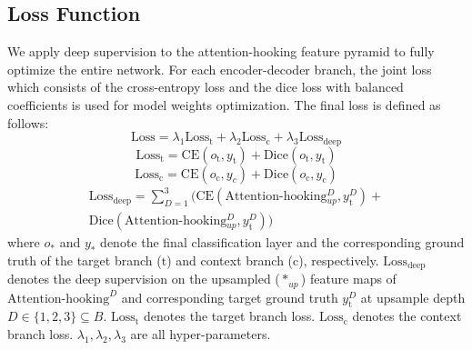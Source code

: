 \documentclass[lettersize,journal,siunitx]{IEEEtran}
\begin{document}
\subsection{Loss Function}
We apply deep supervision to the attention-hooking feature pyramid to fully optimize the entire network. For each encoder-decoder branch, the joint loss which consists of the cross-entropy loss and the dice loss with balanced coefficients is used for model weights optimization. The final loss is defined as follows:
\begin{equation}
\mathrm{Loss}=\lambda{_1}\mathrm{Loss_{t}}+\lambda{_2}\mathrm{Loss_{c}}+\lambda{_3}\mathrm{Loss_{deep}}
\label{eq7}
\end{equation}
\begin{equation}
    \mathrm{Loss_{t}}=\mathrm{CE}(o_\mathrm{t},y_\mathrm{t})+\mathrm{Dice}(o_\mathrm{t},y_\mathrm{t})
\end{equation}
\begin{equation}
    \mathrm{Loss_{c}}=\mathrm{CE}(o_\mathrm{c},y_{c})+\mathrm{Dice}(o_\mathrm{c},y_\mathrm{c})
\end{equation}
\begin{multline}
    \mathrm{Loss_{deep}}=\sum_{D=1}^{3}\bigl(\mathrm{CE}(\mathrm{Attention\mbox{-}hooking}{^{D}_{up}},y_\mathrm{t}^{D})+ \\ \mathrm{Dice}(\mathrm{Attention\mbox{-}hooking}{^{D}_{up}},y_\mathrm{t}^{D})\bigr)
\end{multline}
where $o_{*}$ and $y_{*}$ denote the final classification layer and the corresponding ground truth of the target branch ($\mathrm{t}$) and context branch ($\mathrm{c}$), respectively. $\mathrm{Loss_{deep}}$ denotes the deep supervision on the upsampled ($*_{up}$) feature maps of  $\mathrm{Attention\mbox{-}hooking}^{D}$ and corresponding target ground truth $y_\mathrm{t}^{D}$ at upsample depth $D\in{\{1,2,3\}}\subseteq{B}$. $\mathrm{Loss_t}$ denotes the target branch loss. $\mathrm{Loss_{c}}$ denotes the context branch loss. $\lambda{_1},\lambda{_2},\lambda{_3}$ are all hyper-parameters.
\end{document}
